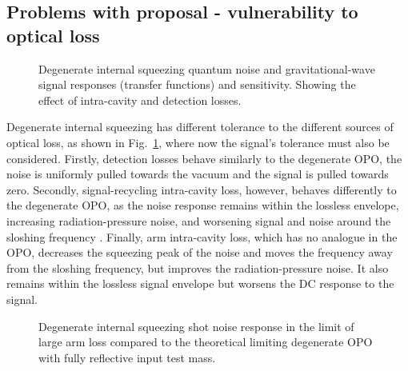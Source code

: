 \subsection{Problems with proposal - vulnerability to optical loss}
\label{sec:dIS_optical_loss}

\begin{figure}
	\centering
	\caption{Degenerate internal squeezing quantum noise and gravitational-wave signal responses (transfer functions) and sensitivity. Showing the effect of intra-cavity and detection losses. }
	\label{fig:dIS_loss_tolerance}
\end{figure}

Degenerate internal squeezing has different tolerance to the different sources of optical loss, as shown in Fig.~\ref{fig:dIS_loss_tolerance}, where now the signal's tolerance must also be considered. Firstly, detection losses behave similarly to the degenerate OPO, the noise is uniformly pulled towards the vacuum and the signal is pulled towards zero. Secondly, signal-recycling intra-cavity loss, however, behaves differently to the degenerate OPO, as the noise response remains within the lossless envelope, increasing radiation-pressure noise, and worsening signal and noise around the sloshing frequency . Finally, arm intra-cavity loss, which has no analogue in the OPO, decreases the squeezing peak of the noise and moves the frequency away from the sloshing frequency, but improves the radiation-pressure noise. It also remains within the lossless signal envelope but worsens the DC response to the signal.

\begin{figure}
	\centering
	\caption{Degenerate internal squeezing shot noise response in the limit of large arm loss compared to the theoretical limiting degenerate OPO with fully reflective input test mass.}
	\label{fig:}
\end{figure}

